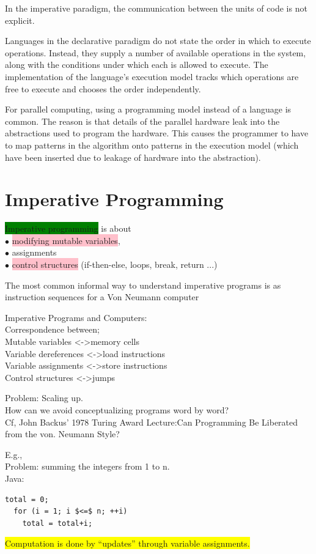 \documentclass[tikz,border=10pt]{project_plan}
\newcommand{\bulletPoint}{\hspace{-3.1pt}$\bullet$ \hspace{5pt}}
\begin{document}
In the imperative paradigm, the communication between the units of code is not explicit.

Languages in the declarative paradigm do not state the order
in which to execute operations. Instead, they supply a number of available
operations in the system, along with the conditions under which each
is allowed to execute. The implementation of the language's execution model
tracks which operations are free to execute and chooses the order
independently.

For parallel computing, using a programming model instead of a language is
common. The reason is that details of the parallel hardware leak into the
abstractions used to program the hardware. This causes the programmer to
have to map patterns in the algorithm onto patterns in the execution model
(which have been inserted due to leakage of hardware into the abstraction).

\section{Imperative Programming}

\colorbox{green}{Imperative programming} is about\\
\bulletPoint \colorbox{pink}{modifying mutable variables},\\
\bulletPoint assignments\\
\bulletPoint \colorbox{pink}{control structures} (if-then-else, loops, break, return ...)

The most common informal way to understand
imperative programs is as instruction sequences for a
Von Neumann computer

Imperative Programs and Computers:\\
Correspondence between;\\
Mutable variables \textless-\textgreater memory cells\\
Variable dereferences \textless-\textgreater load instructions\\
Variable assignments \textless-\textgreater store instructions\\
Control structures \textless-\textgreater jumps

Problem: Scaling up.\\
How can we avoid conceptualizing programs word by word?\\
Cf, John Backus’ 1978 Turing Award Lecture:Can Programming Be Liberated from the von. Neumann Style?

E.g.,\\
Problem: summing the integers from 1 to n.\\
Java:
\begin{lstlisting}[mathescape]
  total = 0;
  for (i = 1; i $<=$ n; ++i)
    total = total+i;
\end{lstlisting}
\colorbox{yellow}{Computation is done by “updates” through variable assignments.}
\end{document}
